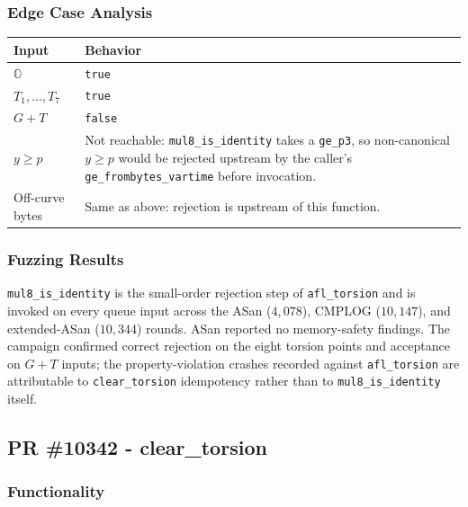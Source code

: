 \documentclass[12pt,titlepage,table]{article}
\begin{document}
\subsubsection{Edge Case Analysis}

\begin{table}[htbp]
\centering
{
\begin{tabular}{| p{1.8in} | p{4.3in} |}
\hline
\textbf{Input} & \textbf{Behavior} \\
\hline
\hline
$\mathbb{O}$ & \verb+true+ \\
$T_1,...,T_7$ & \verb+true+ \\
$G+T$ & \verb+false+ \\
$y \geq p$ & Not reachable: \verb+mul8_is_identity+ takes a \verb+ge_p3+, so non-canonical $y \geq p$ would be rejected upstream by the caller's \verb+ge_frombytes_vartime+ before invocation.\\
Off-curve bytes & Same as above: rejection is upstream of this function.\\
\hline
\end{tabular}}
\end{table}

\subsubsection{Fuzzing Results}
\verb+mul8_is_identity+ is the small-order rejection step of \verb+afl_torsion+ and is invoked on every queue input across the ASan ($4{,}078$), CMPLOG ($10{,}147$), and extended-ASan ($10{,}344$) rounds.  ASan reported no memory-safety findings.  The campaign confirmed correct rejection on the eight torsion points and acceptance on $G + T$ inputs; the property-violation crashes recorded against \verb+afl_torsion+ are attributable to \verb+clear_torsion+ idempotency rather than to \verb+mul8_is_identity+ itself.

\newpage
\subsection{PR \#10342 - clear\_torsion}
\subsubsection{Functionality}

\end{document}
